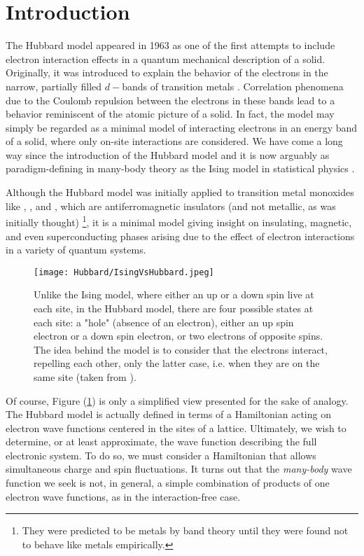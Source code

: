 \section{Introduction}\label{sec:intro}

The Hubbard model appeared in 1963 as one of the first attempts to include electron interaction effects in a quantum mechanical description of a solid.
Originally, it was introduced to explain the behavior of the electrons in the narrow, partially filled $d-$bands of transition metals \cite{hubbard_electron_1963}.
Correlation phenomena due to the Coulomb repulsion between the electrons in these bands lead to a behavior reminiscent of the atomic picture of a solid.
In fact, the model may simply be regarded as a minimal model of interacting electrons in an energy band of a solid, where only on-site interactions are considered.
We have come a long way since the introduction of the Hubbard model and it is now arguably as paradigm-defining in many-body theory as the Ising model in statistical physics \cite{fazekas_lecture_1999, mahan_many-particle_2000, altland_condensed_2010}.

Although the Hubbard model was initially applied to transition metal monoxides like , , and , which are antiferromagnetic insulators (and not metallic, as was initially thought) \footnote{They were predicted to be metals by band theory until they were found not to behave like metals empirically.}, it is a minimal model giving insight on insulating, magnetic, and even superconducting phases arising due to the effect of electron interactions in a variety of quantum systems.

\begin{figure}[H]
	\centering
\texttt{[image: Hubbard/IsingVsHubbard.jpeg]}
	\caption[Graphical comparison between the Ising and the Hubbard model.]{Unlike the Ising model, where either an up or a down spin live at each site, in the Hubbard model, there are four possible states at each site: a "hole" (absence of an electron), either an up spin electron or a down spin electron, or two electrons of opposite spins.
	The idea behind the model is to consider that the electrons interact, repelling each other, only the latter case, i.e. when they are on the same site (taken from \cite{hayes_hip-hop_2009}).}
	\label{fig:IsingVsHubbard}
\end{figure}

Of course, Figure (\ref{fig:IsingVsHubbard}) is only a simplified view presented for the sake of analogy.
The Hubbard model is actually defined in terms of a Hamiltonian acting on electron wave functions centered in the sites of a lattice.
Ultimately, we wish to determine, or at least approximate, the wave function describing the full electronic system.
To do so, we must consider a Hamiltonian that allows simultaneous charge and spin fluctuations.
It turns out that the \emph{many-body} wave function we seek is not, in general, a simple combination of products of one electron wave functions, as in the interaction-free case.

